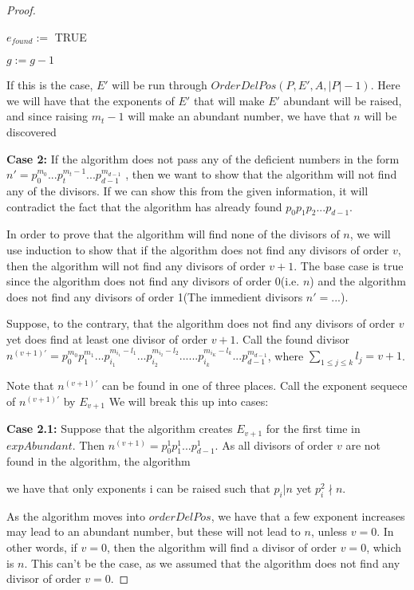 \documentclass[../paper.tex]{subfiles}
\begin{document}
\begin{proof}
\begin{algorithmic}
			\STATE $e_{found} :=$ TRUE
		\ENDIF

	\STATE $g :=  g - 1$

	\ENDIF 

\ENDWHILE

\end{algorithmic}

If this is the case, $E'$ will be run through $OrderDelPos(P, E',
A, |P| - 1)$. Here we will have that the exponents of $E'$ that
will make $E'$ abundant will be raised, and since raising $m_t -1$
will make an abundant number, we have that $n$ will be discovered


\textbf{Case 2:}
  If the algorithm does not pass any of the deficient numbers in
the form $n' = p_0^{m_0}...p_{t}^{m_t - 1}...p_{d-1}^{m_{d-1}}$ ,
then  we want to show that the algorithm will not find any of the
divisors. If we can show this from the given information, it will
contradict the fact that the algorithm has already found $ p_0 p_1
p_2 ... p_{d-1}$.

In order to prove that the algorithm will find none of the
divisors of $n$, we will use induction to show that if the
algorithm does not find any divisors of order $v$, then the
algorithm will not find any divisors of order $v + 1$. The base
case is true since the algorithm does not find any divisors of
order 0(i.e. $n$) and the algorithm does not find any divisors of
order 1(The immedient divisors $n'= ...$).

Suppose, to the contrary, that the algorithm does not find any
divisors of order $v$ yet does find at least one divisor of order
$v+1$. Call the found divisor $n^{(v+1)'}  = p_0^{m_0} p_1^{m_1} ...
p_{i_1}^{m_{i_1} - l_1} ... p_{i_2}^{m_{i_2} - l_2} ... ...
p_{i_k}^{m_{i_K} - l_k} ... p_{d-1}^{m_{d-1}}$, where $\sum_{1 \leq j
\leq k} l_j = v + 1$.

Note that $n^{(v+1)'}$ can be found in one of three places. Call 
the exponent sequece of $n^{(v+1)'}$ by $E_{v+1}$ 
We will break this up into cases:

\textbf{Case 2.1:} 
  Suppose that the algorithm creates $E_{v+1}$ for the first time in
$expAbundant$. Then $n^{(v+1)} = p_0^1 p_1^1 ... p_{d-1}^1$. As all
divisors of order $v$ are not found in the algorithm, the
algorithm   

we have that
only exponents i can be raised such that $p_i | n$ yet $p_i^2
\nmid n$. 

  As the algorithm moves into $orderDelPos$, we have that a few
exponent increases may lead to an abundant number, but these will
not lead to $n$, unless $v = 0$. In other words, if $v= 0$, then
the algorithm will find a divisor of order $v = 0$, which is $n$.
This can't be the case, as we assumed that the algorithm does not
find any divisor of order $v = 0$.


\end{proof}
\end{document}
